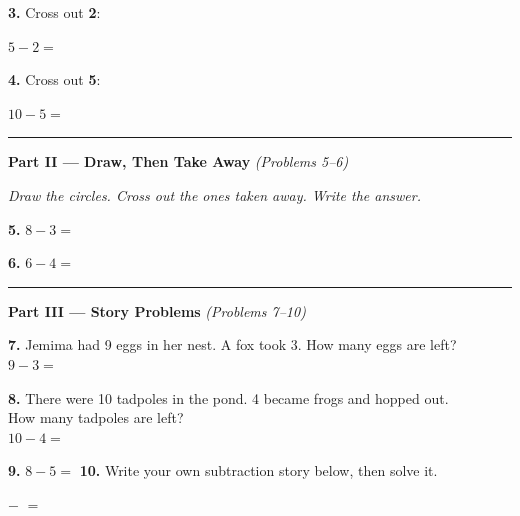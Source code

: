 \documentclass[12pt, letterpaper]{article}
\newcommand{\biganswerline}{\underline{\hspace{4cm}}}
\newcommand{\numbox}{\fbox{\hspace{0.6cm}\vphantom{0}}}
\begin{document}
\bigskip
\noindent\textbf{3.} Cross out \textbf{2}:
\hfill $5 - 2 = $ \numbox

\bigskip
\noindent\textbf{4.} Cross out \textbf{5}:
\hfill $10 - 5 = $ \numbox

\bigskip
\noindent\textcolor{scholared}{\rule{\linewidth}{0.4pt}}

\noindent\textcolor{scholared}{\large\textbf{Part II — Draw, Then Take Away}} \hfill \textit{(Problems 5–6)}

\medskip\noindent\textit{Draw the circles. Cross out the ones taken away. Write the answer.}

\bigskip
\noindent\textbf{5.} $8 - 3 = $ \numbox

\medskip
{}

\bigskip
\noindent\textbf{6.} $6 - 4 = $ \numbox

\medskip
{}

\bigskip
\noindent\textcolor{scholared}{\rule{\linewidth}{0.4pt}}

\noindent\textcolor{scholared}{\large\textbf{Part III — Story Problems}} \hfill \textit{(Problems 7–10)}

\bigskip

\begin{storybox}
\textbf{7.} Jemima had 9 eggs in her nest. A fox took 3. How many eggs are left?\\[6pt]
\hspace{1em} $9 - 3 = $ \numbox
\end{storybox}

\bigskip

\begin{storybox}
\textbf{8.} There were 10 tadpoles in the pond. 4 became frogs and hopped out.\\
How many tadpoles are left?\\[6pt]
\hspace{1em} $10 - 4 = $ \numbox
\end{storybox}

\bigskip

\noindent\textbf{9.} $8 - 5 = $ \numbox \hspace{2cm}
\textbf{10.} Write your own subtraction story below, then solve it.

\medskip
\hspace{1em} \biganswerline

\medskip
\hspace{1em} \numbox \; $-$ \; \numbox \; $=$ \; \numbox
\end{document}
